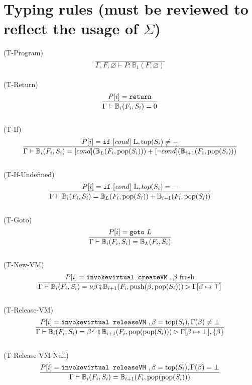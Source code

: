 \documentclass{amsart}
\newcommand{\bB}[1]{\mathbb{B}_{#1}}
\renewcommand{\emptyset}{\varnothing}
\numberwithin{equation}{section}
\theoremstyle{plain} %
\theoremstyle{definition}
\theoremstyle{remark}
\begin{document}
\section{Typing rules (must be reviewed to reflect the usage of $\Sigma$)}
(T-Program)
\begin{equation*}
\frac{}
{\Gamma, F,\emptyset \vdash P: \bB{1}(F, \emptyset)}
\end{equation*}
\\
(T-Return)
\begin{equation*}
\frac{P[i] = \text{\texttt{return}}}
{\Gamma \vdash \bB{i}(F_i, S_i) = 0}
\end{equation*}
\\
(T-If)
\begin{equation*}\frac{P[i] = \text{\texttt{if} [\emph{cond}] L}, \text{top}(S_i) \neq -}
{\Gamma \vdash \bB{i}(F_i, S_i) = [cond] (\bB{L}(F_i, \text{pop}(S_i))) +
 [\neg cond] (\bB{i+1}(F_i, \text{pop}(S_i)))}
\end{equation*}
\\
(T-If-Undefined)
\begin{equation*}\frac{P[i] = \text{\texttt{if} [\emph{cond}] L}, top(S_i) = -}
{\Gamma \vdash \bB{i}(F_i, S_i) = \bB{L}(F_i, \text{pop}(S_i)) + \bB{i+1}(F_i, \text{pop}(S_i))}
\end{equation*}
\\
(T-Goto)
\begin{equation*}
\frac{P[i] = \text{\texttt{goto} $L$}}
{\Gamma \vdash \bB{i}(F_i, S_i) = \bB{L}(F_i, S_i)}
\end{equation*}
\\
(T-New-VM)
\begin{equation*}\frac{
P[i] = \text{\texttt{invokevirtual createVM} }, \beta \text{ fresh}}
{\Gamma \vdash \bB{i}(F_i, S_i) = \nu \beta \fatsemi \bB{i+1}(F_i, \text{push}(\beta,\text{pop}(S_i))) \rhd \Gamma[\beta \mapsto \top]}
\end{equation*}
\\
(T-Release-VM)
\begin{equation*}
\frac{P[i] = \text{\texttt{invokevirtual releaseVM} }, \beta = \text{top}(S_i), \Gamma(\beta) \neq \bot}
{\Gamma \vdash \bB{i}(F_i, S_i) = \beta^{\checkmark} \fatsemi \bB{i+1}(F_i, \text{pop(pop}(S_i))) \rhd \Gamma[\beta \mapsto \bot], \{\beta\}}
\end{equation*}
\\
(T-Release-VM-Null)
\begin{equation*}
\frac{P[i] = \text{\texttt{invokevirtual releaseVM} }, \beta = \text{top}(S_i), \Gamma(\beta) = \bot}
{\Gamma \vdash \bB{i}(F_i, S_i) = \bB{i+1}(F_i, \text{pop(pop}(S_i)))}
\end{equation*}
\end{document}
